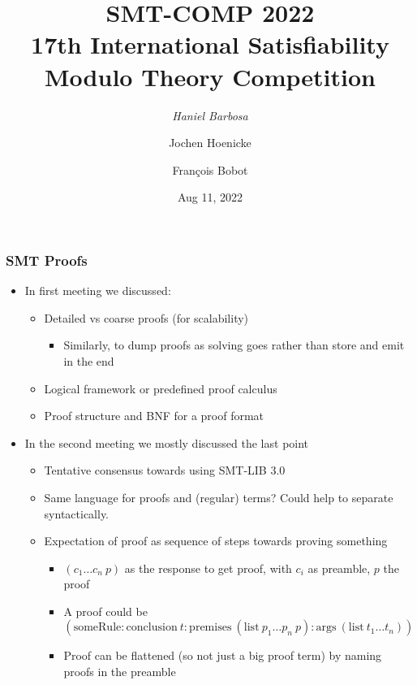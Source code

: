 \documentclass[table]{beamer}
\title{SMT-COMP 2022\\
17th International Satisfiability Modulo Theory Competition}
\author{\emph{Haniel Barbosa} \and Jochen Hoenicke \and Fran\c{c}ois Bobot}
\date{Aug 11, 2022}
\institute{
  Universidade Federal de Minas Gerais, Brazil \and
  Albert-Ludwigs-Universit\"at Freiburg, Germany \and
  CEA List, France
}
\begin{document}
\begin{frame}
  \frametitle{SMT Proofs}

  \begin{itemize}
    \item In first meeting we discussed:
    \begin{itemize}
      \item Detailed vs coarse proofs (for scalability)
      \begin{itemize}
        \item Similarly, to dump proofs as solving goes rather than store and
        emit in the end
      \end{itemize}

      \item Logical framework or predefined proof calculus

      \item Proof structure and BNF for a proof format

    \end{itemize}
    \item In the second meeting we mostly discussed the last point
    \begin{itemize}
      \item Tentative consensus towards using SMT-LIB 3.0
      \item Same language for proofs and (regular) terms? Could help to separate syntactically.
      \item Expectation of proof as sequence of steps towards proving something
      \begin{itemize}
        \item $(c_1 \dots c_n\ p)$ as the response to get proof, with $c_i$ as
        preamble, $p$ the proof
        \item A proof could be $(\mathrm{someRule} :\mathrm{conclusion}\ t :\mathrm{premises}\ (\mathrm{list}\
        p_1 \dots p_n\ p) :\mathrm{args}\ (\mathrm{list}\ t_1\dots t_n))$
        \item Proof can be flattened (so not just a big proof term) by naming
        proofs in the preamble
      \end{itemize}
    \end{itemize}
  \end{itemize}
\end{frame}
\end{document}
